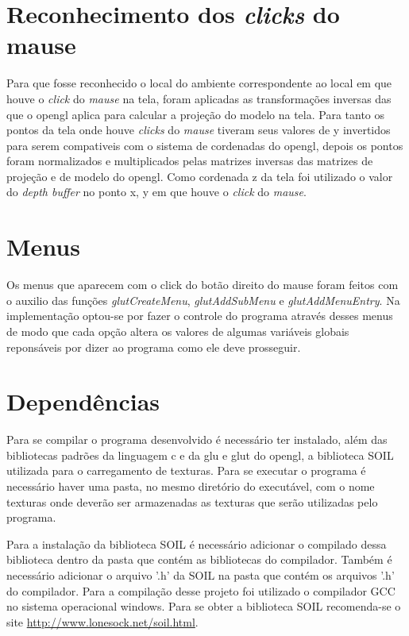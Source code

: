 \documentclass[
	12pt,				%
	openright,			%
	a4paper,			%
	english,			%
	french,				%
	spanish,			%
	brazil,				%
	]{abntex2}
\begin{document}
\section{Reconhecimento dos \emph{clicks} do mause}

	Para que fosse reconhecido o local do ambiente correspondente ao local em que houve o \emph{click} do \emph{mause} na tela, foram aplicadas as transformações inversas das que o opengl aplica para calcular a projeção do modelo na tela. Para tanto os pontos da tela onde houve \emph{clicks} do \emph{mause} tiveram seus valores de y invertidos para serem compativeis com o sistema de cordenadas do opengl, depois os pontos foram normalizados e multiplicados pelas matrizes inversas das matrizes de projeção e de modelo do opengl. Como cordenada z da tela foi utilizado o valor do \emph{depth buffer} no ponto x, y em que houve o \emph{click}  do \emph{mause}.  	


\section{Menus}

	Os menus que aparecem com o click do botão direito do mause foram feitos com o auxilio das funções \emph{glutCreateMenu}, \emph{glutAddSubMenu} e \emph{glutAddMenuEntry}. Na implementação optou-se por fazer o controle do programa através desses menus de modo que cada opção altera os valores de algumas variáveis globais reponsáveis por dizer ao programa como ele deve prosseguir. 

   
\section{Dependências}
\label{subsec:dependencias}
	
Para se compilar o programa desenvolvido é necessário ter instalado, além das bibliotecas padrões da linguagem c e da glu e glut do opengl, a biblioteca SOIL utilizada para o carregamento de texturas. Para se executar o programa é necessário haver uma pasta, no mesmo diretório do executável, com o nome texturas onde deverão ser armazenadas as texturas que serão utilizadas pelo programa.

Para a instalação da biblioteca SOIL é necessário adicionar o compilado dessa biblioteca dentro da pasta que contém as bibliotecas do compilador. Também é necessário adicionar o arquivo '.h' da SOIL na pasta que contém os arquivos '.h' do compilador. Para a compilação desse projeto foi utilizado o compilador GCC no sistema operacional windows. Para se obter a biblioteca SOIL recomenda-se o site \url{http://www.lonesock.net/soil.html}.
\end{document}

